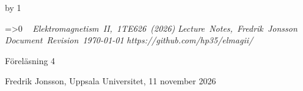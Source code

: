 {{\cleardoublepage
%
%
%
%
%
%
%
\def\coursename{Elektromagnetism II}
\def\coursecode{1TE626}
\def\courseyear{2026}
\def\courserepo{https://github.com/hp35/elmagii/}
\def\lecturenumber{4}
\def\lecturetitle{Magnetostatik}
\def\lecturesubtitle{}
\def\lectureauthor{Fredrik Jonsson}
\def\lectureplace{Uppsala Universitet}
\def\lecturedate{11 november 2026}
\edef\expandedlecturenumber{4}
\def\ifempty#1{\ifx\relax#1\relax}
\advance\chapno by 1
\immediate{}
\hsize=150mm\hoffset=4.6mm\vsize=230mm\voffset=7mm
\topskip=0pt\baselineskip=12pt\parskip=0pt\leftskip=0pt\parindent=15pt
\ifcolors
  \voffset=-10.2mm\topskip=0pt
\fi
\headline={\ifnum\secno>0\ifodd\pageno\rightheadline\else\leftheadline\fi
  \else\hfill\fi}
\def\rightheadline{\tenrm{\it F\"orel\"asning 4}
  \hfil{\it \coursename, \coursecode\ (\courseyear)}}
\def\leftheadline{\tenrm{\it \coursename, \coursecode\ (\courseyear)}
  \hfil{\it F\"orel\"asning 4}}
\noindent~\vskip-60pt\hskip-40pt{}
\vskip-42pt\hfill\vbox{
    \hbox{{\it \coursename, \coursecode\ (\courseyear)}}
    \hbox{{\it Lecture Notes, \lectureauthor}}
    \hbox{{\it Document Revision \today}}
    \hbox{{\it \courserepo}}}\vskip 36pt
\centerline{\twelvesc F\"orel\"asning 4}
\vskip 24pt\noindent
\centerline{}
\expandafter\ifempty\expandafter{\lecturesubtitle}%
  \else\centerline{\twelvesc\lecturesubtitle}\fi
\bigskip
\centerline{\lectureauthor, \lectureplace, \lecturedate}
\vskip24pt



}}
